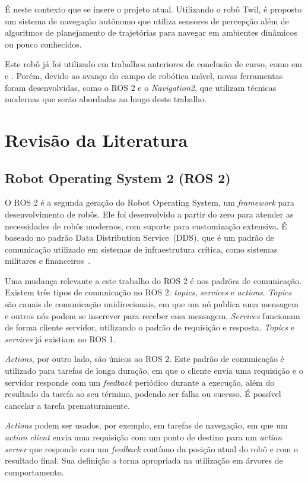 \documentclass[repeatfields,xlists,xpacks,oneside,yearsonly]{ufrgscca}
\begin{document}
É neste contexto que se insere o projeto atual.
Utilizando o robô Twil, é proposto um sistema de navegação autônomo que utiliza
sensores de percepção além de algoritmos de planejamento de trajetórias para
navegar em ambientes dinâmicos ou pouco conhecidos.

Este robô já foi utilizado em trabalhos anteriores de conclusão de curso,
como em \textcite{petry_tcc} e \textcite{rahul_tcc}.
Porém, devido ao avanço do campo de robótica móvel, novas ferramentas
foram desenvolvidas, como o ROS 2 e o \textit{Navigation2}, que utilizam
técnicas modernas que serão abordadas ao longo deste trabalho.

\chapter{Revisão da Literatura}
\label{revisao}

\section{Robot Operating System 2 (ROS 2)}

O ROS 2 é a segunda geração do Robot Operating System,
um \textit{framework} para desenvolvimento de robôs.
Ele foi desenvolvido a partir do zero para atender as necessidades de robôs modernos,
com suporte para customização extensiva.
É baseado no padrão Data Distribution Service~(DDS), que é um padrão de comunicação utilizado
em sistemas de infraestrutura crítica, como sistemas militares e financeiros~\cite{ROS2Article}.

Uma mudança relevante a este trabalho do ROS 2 é nos padrões de comunicação.
Existem três tipos de comunicação no ROS 2: \textit{topics}, \textit{services} e \textit{actions}.
\textit{Topics} são canais de comunicação unidirecionais, em que um nó publica uma mensagem
e outros nós podem se inscrever para receber essa mensagem.
\textit{Services} funcionam de forma cliente servidor, utilizando o padrão de requisição e resposta.
\textit{Topics} e \textit{services} já existiam no ROS 1.

\textit{Actions}, por outro lado, são únicos ao ROS 2.
Este padrão de comunicação é utilizado para tarefas de longa duração,
em que o cliente envia uma requisição e o servidor responde com um \textit{feedback} periódico
durante a execução, além do resultado da tarefa ao seu término, podendo ser falha ou sucesso.
É possível cancelar a tarefa prematuramente.

\textit{Actions} podem ser usados, por exemplo, em tarefas de navegação, em que um \textit{action client}
envia uma requisição com um ponto de destino para um \textit{action server}
que responde com um \textit{feedback} contínuo da posição atual do robô e
com o resultado final.
Sua definição a torna apropriada na utilização em árvores de comportamento.
\end{document}
